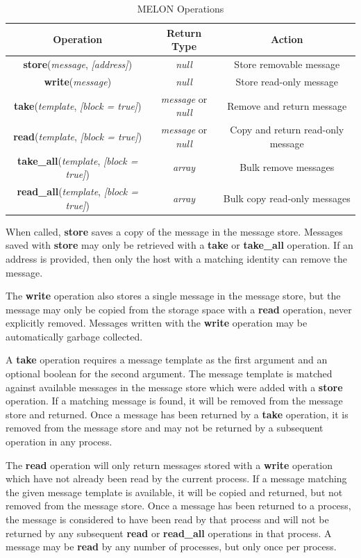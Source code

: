 \documentclass[lnicst]{svmultln}
\begin{document}
\begin{table}
\centering
\begin{tabular}{|c|c|c|}
\hline
\textbf{Operation} & \textbf{Return Type} & \textbf{Action} \\ \hline
\textbf{store}(\textit{message}, \textit{[address]}) & \textit{null} & Store removable message \\ \hline
\textbf{write}(\textit{message}) & \textit{null} & Store read-only message \\ \hline
\textbf{take}(\textit{template}, \textit{[block = true]}) & \textit{message} or \textit{null} & Remove and return message \\ \hline
\textbf{read}(\textit{template}, \textit{[block = true]}) & \textit{message} or \textit{null} & Copy and return read-only message \\ \hline
\textbf{take\_all}(\textit{template}, \textit{[block = true]}) & \textit{array} & Bulk remove messages \\ \hline
\textbf{read\_all}(\textit{template}, \textit{[block = true]}) & \textit{array} & Bulk copy read-only messages \\ \hline
\end{tabular}
\caption{MELON Operations}
\end{table}

When called, \textbf{store} saves a copy of the message in the message store. Messages saved with \textbf{store} may only be retrieved with a \textbf{take} or \textbf{take\_all} operation. If an address is provided, then only the host with a matching identity can remove the message.

The \textbf{write} operation also stores a single message in the message store, but the message may only be copied from the storage space with a \textbf{read} operation, never explicitly removed. Messages written with the \textbf{write} operation may be automatically garbage collected.

A \textbf{take} operation requires a message template as the first argument and an optional boolean for the second argument. The message template is matched against available messages in the message store which were added with a \textbf{store} operation. If a matching message is found, it will be removed from the message store and returned. Once a message has been returned by a \textbf{take} operation, it is removed from the message store and may not be returned by a subsequent operation in any process.

The \textbf{read} operation will only return messages stored with a \textbf{write} operation which have not already been read by the current process. If a message matching the given message template is available, it will be copied and returned, but not removed from the message store. Once a message has been returned to a process, the message is considered to have been read by that process and will not be returned by any subsequent \textbf{read} or \textbf{read\_all} operations in that process. A message may be \textbf{read} by any number of processes, but only once per process.
\end{document}
